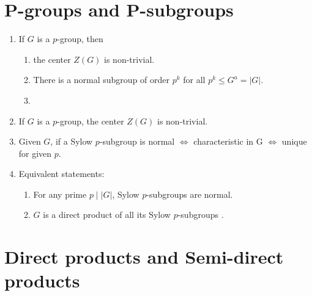 \documentclass[10pt]{article}
\newcommand{\abs}[1]{\left|#1\right|}
\newcommand{\sps}{Sylow $p$-subgroup }
\newcommand{\spss}{Sylow $p$-subgroups }
\begin{document}
\begin{multicols*}{3}
  \section{P-groups and P-subgroups}
  \begin{enumerate}
    \item If $G$ is a $p$-group, then
      \begin{enumerate}
          \item the center $Z(G)$ is non-trivial.
        \item There is a normal subgroup of order $p^{k}$ for all
          $p^{k}\leq G^{a}=\abs{G}$.
          \item
      \end{enumerate}
      \item If $G$ is a $p$-group, the center $Z(G)$ is non-trivial.
      \item Given $G$, if a \sps is normal $\iff$ characteristic in G $\iff$ unique for given $p$.
    \item Equivalent statements:
      \begin{enumerate}
          \item For any prime $p\mid\abs{G}$, \spss are normal.
          \item $G$ is a direct product of all its \spss .
       \end{enumerate}
  \end{enumerate}

  \section{Direct products and Semi-direct products}
\end{multicols*}
\end{document}
